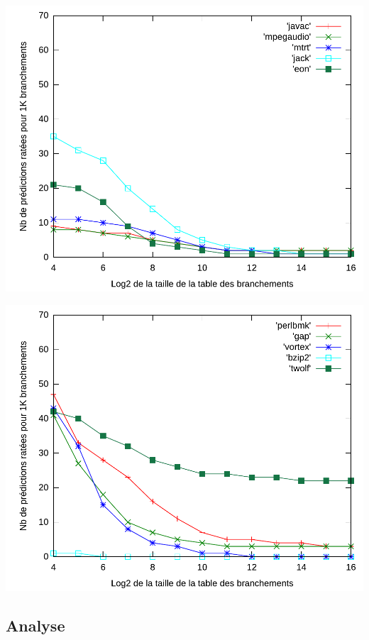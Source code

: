 \documentclass[a4paper]{article}
\begin{document}
\begin{minipage}{.48\linewidth}
\includegraphics[width=\linewidth]{../figures-local/local-2}
\end{minipage}%
\hfill
\begin{minipage}{.48\linewidth}
\includegraphics[width=\linewidth]{../figures-local/local-3}
\end{minipage}
\subsection{Analyse}
\end{document}
